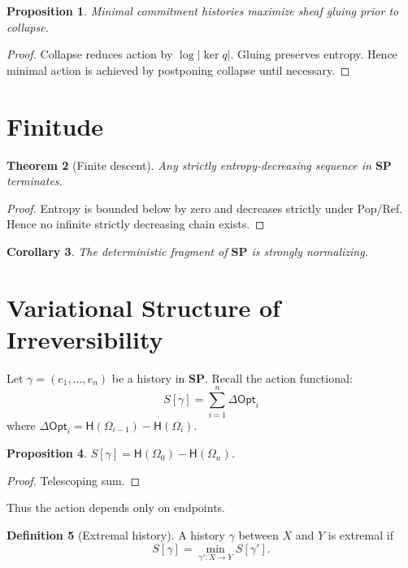 \documentclass[12pt,a4paper]{article}
\newtheorem{theorem}{Theorem}[section]
\newtheorem{proposition}[theorem]{Proposition}
\newtheorem{corollary}[theorem]{Corollary}
\theoremstyle{definition}
\newtheorem{definition}[theorem]{Definition}
\theoremstyle{remark}
\newcommand{\Ent}{\ensuremath{\mathsf{H}}}
\newcommand{\Opt}{\ensuremath{\mathsf{Opt}}}
\newcommand{\SP}{\mathbf{SP}}
\begin{document}
\begin{proposition}
Minimal commitment histories maximize sheaf gluing prior to collapse.
\end{proposition}

\begin{proof}
Collapse reduces action by $\log|\ker q|$.
Gluing preserves entropy.
Hence minimal action is achieved by postponing collapse until necessary.
\end{proof}

\section{Finitude}
\label{sec:finitude}

\begin{theorem}[Finite descent]
Any strictly entropy-decreasing sequence in $\SP$ terminates.
\end{theorem}

\begin{proof}
Entropy is bounded below by zero and decreases strictly under Pop/Ref.
Hence no infinite strictly decreasing chain exists.
\end{proof}

\begin{corollary}
The deterministic fragment of $\SP$ is strongly normalizing.
\end{corollary}

\section{Variational Structure of Irreversibility}
\label{sec:variational}

Let $\gamma = (e_1,\dots,e_n)$ be a history in $\SP$.
Recall the action functional:
\[
  S[\gamma] = \sum_{i=1}^n \Delta\Opt_i
\]
where $\Delta\Opt_i = \Ent(\Omega_{i-1}) - \Ent(\Omega_i)$.

\begin{proposition}
$S[\gamma] = \Ent(\Omega_0) - \Ent(\Omega_n)$.
\end{proposition}

\begin{proof}
Telescoping sum.
\end{proof}

Thus the action depends only on endpoints.

\begin{definition}[Extremal history]
A history $\gamma$ between $X$ and $Y$ is extremal if
\[
  S[\gamma] = \min_{\gamma' : X \to Y} S[\gamma'].
\]
\end{definition}
\end{document}
